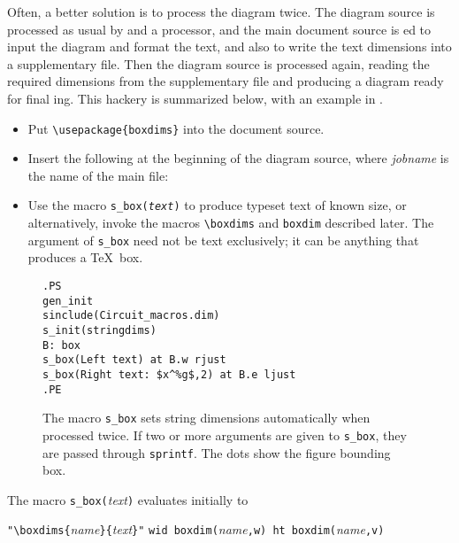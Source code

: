 Often, a better solution is to process the diagram twice.  The
diagram source is processed as usual by \Mfour and a \pic processor, and the
main document source is \latex{}ed to input the diagram and format the
text, and also to write the text dimensions into a supplementary file.
Then the diagram source is processed again, reading the required
dimensions from the supplementary file and producing a diagram ready
for final \latex{}ing.  This hackery is summarized below, with an example
in .
\begin{itemize}
\item Put \verb|\usepackage{boxdims}| into the document source.
\item Insert the following at the beginning of the diagram source,
 where {\sl jobname} is the name of the main \latex file:\hfill\break
\item Use the macro {\tt s\_box({\sl text})} to produce
 typeset text of known size, or alternatively, invoke the macros
 \verb|\boxdims| and \verb|boxdim| described later.
 The argument of {\tt s\_box} need not be text exclusively; it can
 be anything that produces a \TeX\ box.
\end{itemize}
\begin{figure}[h!t]
   \parbox{3.5in}{\small\tt.PS\\
     gen\_init\\
     sinclude(Circuit\_macros.dim)\\
     s\_init(stringdims)\\
     B: box\\
       \hbox{}\quad s\_box(Left text) at B.w rjust\\
       \hbox{}\quad s\_box(Right text: \$x\^{}{\%g}\$,2) at B.e ljust\\
     .PE}%
   \hfill\llap{\raise-0.25in\hbox{ }}%
   \caption{The macro {\tt s\_box} sets string dimensions automatically
    when processed twice.  If two or more arguments are
    given to {\tt s\_box}, they
    are passed through {\tt sprintf}.  The dots show the figure bounding box.}
   \label{stringdim}
   \end{figure}

\noindent The macro \verb|s_box(|{\sl text}\verb|)| evaluates initially to

 \verb|"\boxdims{|{\sl name}\verb|}{|{\sl text}\verb|}"|
  \verb|wid boxdim(|{\sl name}\verb|,w) ht boxdim(|{\sl name}\verb|,v)|

